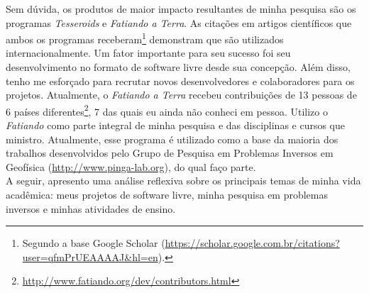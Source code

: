 Sem dúvida, os produtos de maior impacto resultantes de minha pesquisa são os
programas {\em Tesseroids} e {\em Fatiando a Terra}.
As citações em artigos científicos que ambos os programas
receberam\footnote{Segundo a base Google Scholar
(\url{https://scholar.google.com.br/citations?user=qfmPrUEAAAAJ&hl=en}).}
demonstram que são utilizados internacionalmente.
Um fator importante para seu sucesso foi seu desenvolvimento no formato de
software livre desde sua concepção.
Além disso, tenho me esforçado para recrutar novos desenvolvedores e
colaboradores para os projetos.
Atualmente, o {\em Fatiando a Terra} recebeu contribuições de 13 pessoas de 6
países
diferentes\footnote{\url{http://www.fatiando.org/dev/contributors.html}},
7 das quais eu ainda não conheci em pessoa.
Utilizo o {\em Fatiando} como parte integral de minha pesquisa e das
disciplinas e cursos que ministro.
Atualmente, esse programa é utilizado como a base da maioria dos trabalhos
desenvolvidos pelo Grupo de Pesquisa em Problemas Inversos em Geofísica
(\url{http://www.pinga-lab.org}), do qual faço parte.
\\[0.5cm]

A seguir, apresento uma análise reflexiva sobre os principais temas de minha
vida acadêmica: meus projetos de software livre, minha pesquisa em problemas
inversos e minhas atividades de ensino.
